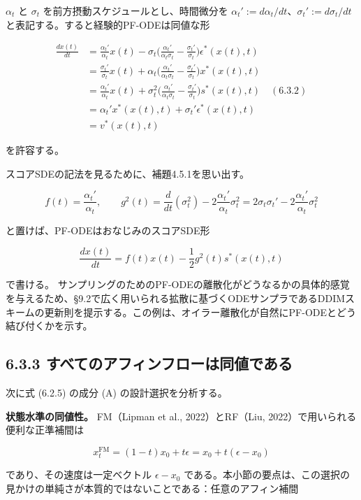 \begin{propositionbox}
$\alpha_t$ と $\sigma_t$ を前方摂動スケジュールとし、時間微分を $\alpha_t':=d\alpha_t/dt$、$\sigma_t':=d\sigma_t/dt$ と表記する。すると経験的PF-ODEは同値な形

\[
\begin{aligned}
\frac{dx(t)}{dt}
&=\frac{\alpha_t'}{\alpha_t}x(t)-\sigma_t\Biggl(\frac{\alpha_t'}{\alpha_t\sigma_t}-\frac{\sigma_t'}{\sigma_t}\Biggr)\epsilon^*(x(t),t) \\
&=\frac{\sigma_t'}{\sigma_t}x(t)+\alpha_t\Biggl(\frac{\alpha_t'}{\alpha_t\sigma_t}-\frac{\sigma_t'}{\sigma_t}\Biggr)x^*(x(t),t) \\
&=\frac{\alpha_t'}{\alpha_t}x(t)+\sigma_t^2\Biggl(\frac{\alpha_t'}{\alpha_t\sigma_t}-\frac{\sigma_t'}{\sigma_t}\Biggr)s^*(x(t),t) \quad (6.3.2) \\
&=\alpha_t'x^*(x(t),t)+\sigma_t'\epsilon^*(x(t),t) \\
&=v^*(x(t),t)
\end{aligned}
\]

を許容する。
\end{propositionbox}


スコアSDEの記法を見るために、補題4.5.1を思い出す。

\[
f(t)=\frac{\alpha_t'}{\alpha_t},\qquad
g^2(t)=\frac{d}{dt}(\sigma_t^2)-2\frac{\alpha_t'}{\alpha_t}\sigma_t^2=2\sigma_t\sigma_t'-2\frac{\alpha_t'}{\alpha_t}\sigma_t^2
\]


と置けば、PF-ODEはおなじみのスコアSDE形

\[
\frac{dx(t)}{dt}=f(t)x(t)-\frac{1}{2}g^2(t)s^*(x(t),t)
\]


で書ける。
サンプリングのためのPF-ODEの離散化がどうなるかの具体的感覚を与えるため、§9.2で広く用いられる拡散に基づくODEサンプラであるDDIMスキームの更新則を提示する。この例は、オイラー離散化が自然にPF-ODEとどう結び付くかを示す。

\subsection*{6.3.3 すべてのアフィンフローは同値である}


次に式 (6.2.5) の成分 (A) の設計選択を分析する。

\textbf{状態水準の同値性。} FM（Lipman et al., 2022）とRF（Liu, 2022）で用いられる便利な正準補間は

\[
x_t^{\mathrm{FM}}=(1-t)x_0+t\epsilon=x_0+t(\epsilon-x_0)
\]


であり、その速度は一定ベクトル $\epsilon-x_0$ である。本小節の要点は、この選択の見かけの単純さが本質的ではないことである：任意のアフィン補間

